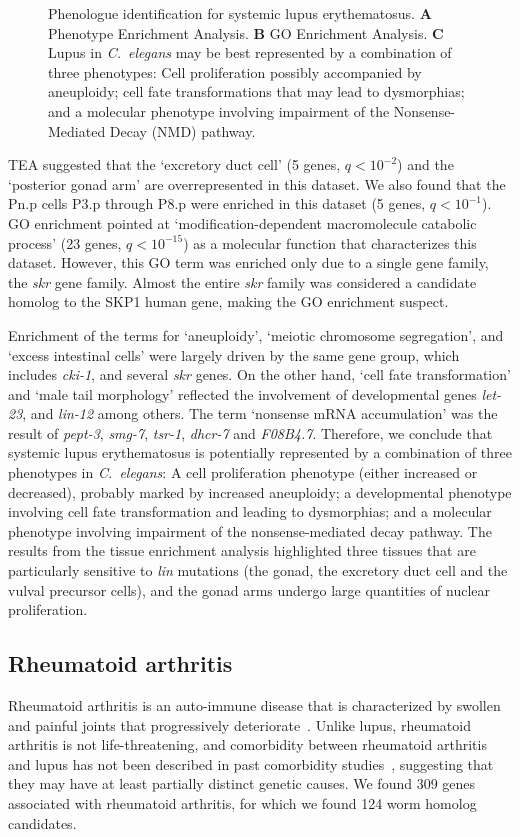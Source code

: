 \documentclass[10pt,letterpaper,twocolumn]{article}
\newcommand{\cel}{\emph{C.~elegans}}
\newcommand{\harthritis}{309}
\newcommand{\warthritis}{124}
\newcommand{\qval}[1]{\ensuremath{q<10^{-#1}}}
\begin{document}
\begin{figure}[htbp]
  \caption{Phenologue identification for systemic lupus erythematosus.
           \textbf{A} Phenotype Enrichment Analysis. \textbf{B} GO Enrichment
           Analysis. \textbf{C} Lupus in \cel{} may be best represented by
           a combination of three phenotypes: Cell proliferation possibly
           accompanied by aneuploidy; cell fate transformations that may lead
           to dysmorphias; and a molecular phenotype involving impairment of
           the Nonsense-Mediated Decay (NMD) pathway.}
\label{fig:lupus}
\end{figure}

TEA suggested that the
`excretory duct cell' (5 genes, \qval{2}) and the `posterior gonad arm' are
overrepresented in this dataset. We also found that the Pn.p cells P3.p through
P8.p were enriched in this dataset (5 genes, \qval{1}). GO enrichment pointed
at `modification-dependent macromolecule catabolic process' (23 genes,
\qval{15}) as a molecular function that characterizes this dataset. However,
this GO term was enriched only due to a single gene family, the \emph{skr} gene
family. Almost the entire \emph{skr} family was considered a candidate homolog
to the SKP1 human gene, making the GO enrichment suspect.

Enrichment of the terms for `aneuploidy', `meiotic chromosome segregation',
and `excess intestinal cells' were largely driven by the same gene group, which
includes \emph{cki-1}, and several \emph{skr} genes. On the other hand, `cell
fate transformation' and `male tail morphology' reflected the involvement of
developmental genes \emph{let-23}, and \emph{lin-12} among others. The term
`nonsense mRNA accumulation' was the result of \emph{pept-3}, \emph{smg-7},
\emph{tsr-1}, \emph{dhcr-7} and \emph{F08B4.7}. Therefore, we conclude that
systemic lupus erythematosus is potentially represented by a combination of three
phenotypes in \cel{}: A cell proliferation phenotype (either increased or
decreased), probably marked by increased
aneuploidy; a developmental phenotype involving cell fate transformation and
leading to dysmorphias; and a molecular phenotype involving impairment of the
nonsense-mediated decay pathway.
The results from the tissue enrichment analysis
highlighted three tissues that are particularly sensitive to \emph{lin} mutations
(the gonad, the excretory duct cell and the vulval precursor cells),
and the gonad arms undergo large quantities of nuclear proliferation.

\subsection*{Rheumatoid arthritis}
Rheumatoid arthritis is an auto-immune disease that is characterized by
swollen and painful joints that progressively deteriorate~\cite{Smolen2016}. Unlike lupus,
rheumatoid arthritis is not life-threatening, and comorbidity between rheumatoid
arthritis and lupus has not been described in past comorbidity studies~\cite{Dougados2013},
suggesting that they may have at least
partially distinct genetic causes. We found \harthritis{} genes associated with
rheumatoid arthritis, for which we found \warthritis{} worm homolog candidates.
\end{document}
